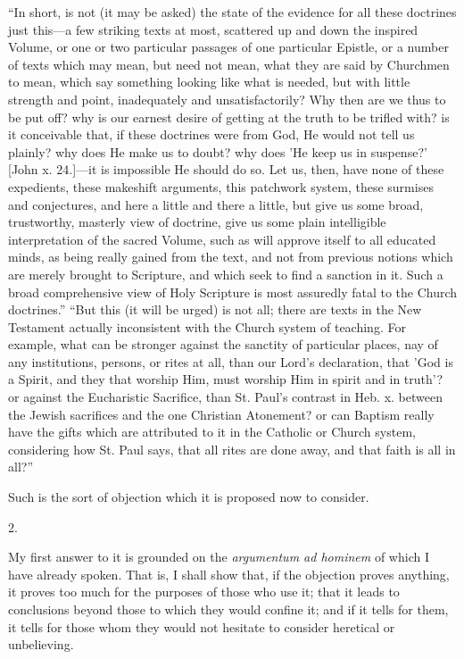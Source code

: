 ``In short, is not (it may be asked) the state of the evidence for
all these doctrines just this—a few striking texts at most,
scattered up and down the inspired Volume, or one or two particular
passages of one particular Epistle, or a number of texts which may
mean, but need not mean, what they are said by Churchmen to mean,
which say something looking like what is needed, but with little
strength and point, inadequately and unsatisfactorily? Why then are we
thus to be put off? why is our earnest desire of getting at the truth
to be trifled with? is it conceivable that, if these doctrines were
from God, He would not tell us plainly? why does He make us to doubt?
why does 'He keep us in suspense?' [John x. 24.]—it is impossible He
should do so. Let us, then, have none of these expedients, these
makeshift arguments, this patchwork system, these surmises and
conjectures, and here a little and there a little, but give us some
broad, trustworthy, masterly view of doctrine, give us some plain
intelligible interpretation of the sacred Volume, such as will approve
itself to all educated minds, as being really gained from the text,
and not from previous notions which are merely brought to Scripture,
and which seek to find a sanction in it. Such a broad comprehensive
view of Holy Scripture is most assuredly fatal to the Church
doctrines.'' ``But this (it will be urged) is not all; there
are texts in the New Testament actually inconsistent with the Church
system of teaching. For example, what can be stronger against the
sanctity of particular places, nay of any institutions, persons, or
rites at all, than our Lord's declaration, that 'God is a Spirit, and
they that worship Him, must worship Him in spirit and in truth'? or
against the Eucharistic Sacrifice, than St. Paul's contrast in Heb. x.
between the Jewish sacrifices and the one Christian Atonement?
or can Baptism really have the gifts which are attributed to it in the
Catholic or Church system, considering how St. Paul says, that all
rites are done away, and that faith is all in all?''

Such is the sort of objection which it is proposed now to consider.

2.

My first answer to it is grounded on the \emph{argumentum ad hominem}
of which I have already spoken. That is, I shall show that, if the
objection proves anything, it proves too much for the purposes of
those who use it; that it leads to conclusions beyond those to which
they would confine it; and if it tells for them, it tells for those
whom they would not hesitate to consider heretical or unbelieving.

